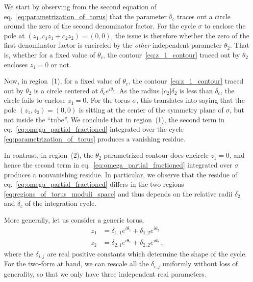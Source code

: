 \documentclass[dvipsnames,preprint,12pt,sort&compress]{elsarticle}
\begin{document}
We start by observing from the second equation of eq.~\eqref{eq:parametrization_of_torus}
that the parameter $\theta_c$ traces out a circle around the zero of the second denominator
factor. For the cycle $\sigma$ to enclose the pole at $(z_1, c_1 z_1 + c_2 z_2) = (0,0)$,
the issue is therefore whether the zero of the first denominator factor is encircled
by the \emph{other} independent parameter $\theta_2$. That is, whether for a fixed value of $\theta_c$,
the contour~\eqref{eq:z_1_contour} traced out by $\theta_2$ encloses $z_1 = 0$ or not.

Now, in region~(1), for a fixed value of $\theta_c$, the contour~\eqref{eq:z_1_contour}
traced out by $\theta_2$ is a circle centered at $\delta_c e^{i\theta_c}$.
As the radius $|c_2| \delta_2$ is less than $\delta_c$, the circle fails to enclose
$z_1 =0$. For the torus $\sigma$, this translates into saying that the pole $(z_1, z_2) = (0,0)$ is sitting
at the center of the symmetry plane of $\sigma$, but not inside the ``tube''.
We conclude that in region~(1), the second term in eq.~\eqref{eq:omega_partial_fractioned}
integrated over the cycle \eqref{eq:parametrization_of_torus} produces a vanishing residue.

In contrast, in region~(2), the $\theta_2$-parametrized contour does encircle
$z_1 =0$, and hence the second term in eq.~\eqref{eq:omega_partial_fractioned}
integrated over $\sigma$ produces a nonvanishing residue.
In particular, we observe that the residue of eq.~\eqref{eq:omega_partial_fractioned}
differs in the two regions \eqref{eq:regions_of_torus_moduli_space} and thus depends on
the relative radii $\delta_2$ and $\delta_c$ of the integration cycle.

More generally, let us consider a generic torus,
\begin{equation}
\begin{aligned}
z_1 &= \delta_{1,1} e^{i\theta_1} + \delta_{1,2} e^{i\theta_2} \\
z_2 &= \delta_{2,1} e^{i\theta_1} + \delta_{2,2} e^{i\theta_2} \,,
\label{eq:generic_torus}
\end{aligned}
\end{equation}
where the $\delta_{i,j}$ are real positive constants which determine the shape of the
cycle. For the two-form at hand, we can rescale all the $\delta_{i,j}$ uniformly
without loss of generality, so that we only have three independent real
parameters.
\end{document}
